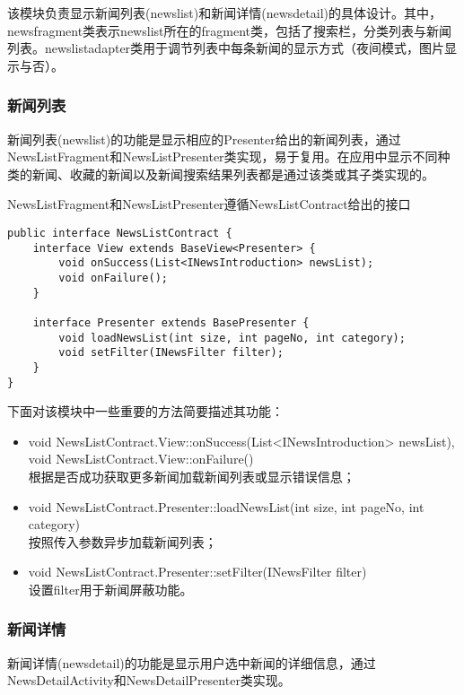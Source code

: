 \documentclass[UTF8]{ctexart}
\begin{document}
	该模块负责显示新闻列表(newslist)和新闻详情(newsdetail)的具体设计。其中，newsfragment类表示newslist所在的fragment类，包括了搜索栏，分类列表与新闻列表。newslistadapter类用于调节列表中每条新闻的显示方式（夜间模式，图片显示与否）。

	\subsubsection{新闻列表}

		新闻列表(newslist)的功能是显示相应的Presenter给出的新闻列表，通过NewsListFragment和NewsListPresenter类实现，易于复用。在应用中显示不同种类的新闻、收藏的新闻以及新闻搜索结果列表都是通过该类或其子类实现的。

		NewsListFragment和NewsListPresenter遵循NewsListContract给出的接口

\begin{verbatim}
public interface NewsListContract {
    interface View extends BaseView<Presenter> {
        void onSuccess(List<INewsIntroduction> newsList);
        void onFailure();
    }

    interface Presenter extends BasePresenter {
        void loadNewsList(int size, int pageNo, int category);
        void setFilter(INewsFilter filter);
    }
}
\end{verbatim}

		下面对该模块中一些重要的方法简要描述其功能：

		\begin{itemize}
			\item void NewsListContract.View::onSuccess(List<INewsIntroduction> newsList),
			\\void NewsListContract.View::onFailure()
			\\根据是否成功获取更多新闻加载新闻列表或显示错误信息；
			\item void NewsListContract.Presenter::loadNewsList(int size, int pageNo, int category)
			\\按照传入参数异步加载新闻列表；
			\item void NewsListContract.Presenter::setFilter(INewsFilter filter)
			\\设置filter用于新闻屏蔽功能。
		\end{itemize}

	\subsubsection{新闻详情}

		新闻详情(newsdetail)的功能是显示用户选中新闻的详细信息，通过NewsDetailActivity和NewsDetailPresenter类实现。
\end{document}

